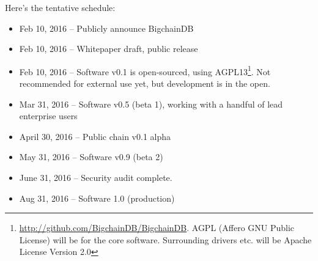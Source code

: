 Here’s the tentative schedule:
\begin{itemize}
  \item Feb 10, 2016 – Publicly announce BigchainDB
  \item Feb 10, 2016 – Whitepaper draft, public release
  \item Feb 10, 2016 – Software v0.1 is open-sourced, using AGPL13\footnote{\url{http://github.com/BigchainDB/BigchainDB}. AGPL (Affero GNU Public License) will be for the core software. Surrounding drivers etc. will be Apache License Version 2.0}. Not recommended for external use yet, but development is in the open.
  \item Mar 31, 2016 – Software v0.5 (beta 1), working with a handful of lead enterprise users
  \item April 30, 2016 – Public chain v0.1 alpha
  \item May 31, 2016 – Software v0.9 (beta 2)
  \item June 31, 2016 – Security audit complete.
  \item Aug 31, 2016 – Software 1.0 (production)
\end{itemize}